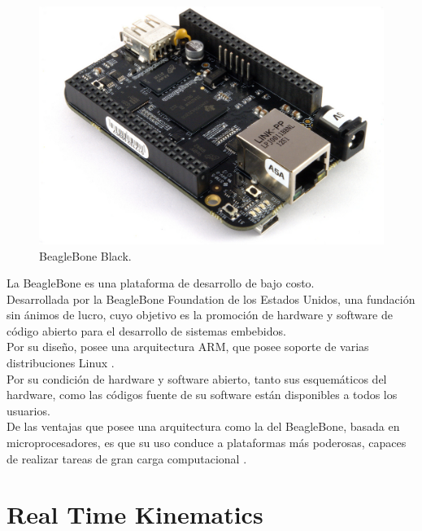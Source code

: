 \begin{figure}[ht]
\centering
\includegraphics[scale=0.18]{Figures/BeagleBoneBlack}
\caption[BeagleBone Black.]{BeagleBone Black.}
\label{fig:BBlack}
\end{figure}

La BeagleBone es una plataforma de desarrollo de bajo costo. \\

Desarrollada por la BeagleBone Foundation de los Estados Unidos, una fundación sin ánimos de lucro, cuyo objetivo es la promoción de hardware y software de código abierto para el desarrollo de sistemas embebidos. \\

Por su diseño, posee una arquitectura ARM, que posee soporte de varias distribuciones Linux \cite{coronado2014desarrollo}. \\

Por su condición de hardware y software abierto, tanto sus esquemáticos del hardware, como las códigos fuente de su software están disponibles a todos los usuarios. \\

De las ventajas que posee una arquitectura como la del BeagleBone, basada en microprocesadores, es que su uso conduce a plataformas más poderosas, capaces de realizar tareas de gran carga computacional \cite{coley2013beaglebone}.

\section{Real Time Kinematics}

